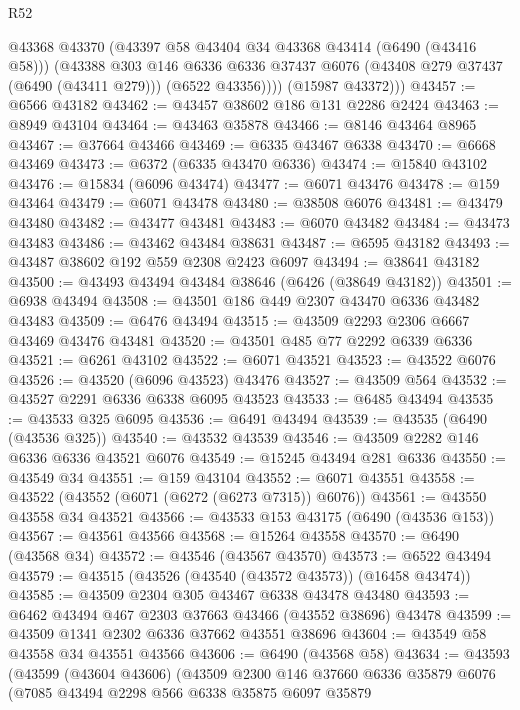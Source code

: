 \begin{lexlean}{R52}
\begin{coremodule}
            @43368
            @43370
            (@43397 @58 @43404 @34 @43368 @43414 (@6490 (@43416 @58)))
            (@43388
              @303
              @146
              @6336
              @6336
              @37437
              @6076
              (@43408 @279 @37437 (@6490 (@43411 @279)))
              (@6522 @43356))))
        (@15987 @43372)))
@43457 := @6566 @43182
@43462 := @43457 @38602 @186 @131 @2286 @2424
@43463 := @8949 @43104
@43464 := @43463 @35878
@43466 := @8146 @43464 @8965
@43467 := @37664 @43466
@43469 := @6335 @43467 @6338
@43470 := @6668 @43469
@43473 := @6372 (@6335 @43470 @6336)
@43474 := @15840 @43102
@43476 := @15834 (@6096 @43474)
@43477 := @6071 @43476
@43478 := @159 @43464
@43479 := @6071 @43478
@43480 := @38508 @6076
@43481 := @43479 @43480
@43482 := @43477 @43481
@43483 := @6070 @43482
@43484 := @43473 @43483
@43486 := @43462 @43484 @38631
@43487 := @6595 @43182
@43493 := @43487 @38602 @192 @559 @2308 @2423 @6097
@43494 := @38641 @43182
@43500 := @43493 @43494 @43484 @38646 (@6426 (@38649 @43182))
@43501 := @6938 @43494
@43508 := @43501 @186 @449 @2307 @43470 @6336 @43482 @43483
@43509 := @6476 @43494
@43515 := @43509 @2293 @2306 @6667 @43469 @43476 @43481
@43520 := @43501 @485 @77 @2292 @6339 @6336
@43521 := @6261 @43102
@43522 := @6071 @43521
@43523 := @43522 @6076
@43526 := @43520 (@6096 @43523) @43476
@43527 := @43509 @564
@43532 := @43527 @2291 @6336 @6338 @6095 @43523
@43533 := @6485 @43494
@43535 := @43533 @325 @6095
@43536 := @6491 @43494
@43539 := @43535 (@6490 (@43536 @325))
@43540 := @43532 @43539
@43546 := @43509 @2282 @146 @6336 @6336 @43521 @6076
@43549 := @15245 @43494 @281 @6336
@43550 := @43549 @34
@43551 := @159 @43104
@43552 := @6071 @43551
@43558 := @43522 (@43552 (@6071 (@6272 (@6273 @7315)) @6076))
@43561 := @43550 @43558 @34 @43521
@43566 := @43533 @153 @43175 (@6490 (@43536 @153))
@43567 := @43561 @43566
@43568 := @15264 @43558
@43570 := @6490 (@43568 @34)
@43572 := @43546 (@43567 @43570)
@43573 := @6522 @43494
@43579 := @43515 (@43526 (@43540 (@43572 @43573)) (@16458 @43474))
@43585 := @43509 @2304 @305 @43467 @6338 @43478 @43480
@43593 := @6462 @43494 @467 @2303 @37663 @43466 (@43552 @38696) @43478
@43599 := @43509 @1341 @2302 @6336 @37662 @43551 @38696
@43604 := @43549 @58 @43558 @34 @43551 @43566
@43606 := @6490 (@43568 @58)
@43634 := @43593
    (@43599
      (@43604 @43606)
      (@43509
        @2300
        @146
        @37660
        @6336
        @35879
        @6076
        (@7085
          @43494
          @2298
          @566
          @6338
          @35875
          @6097
          @35879

\end{coremodule}
\end{lexlean}
